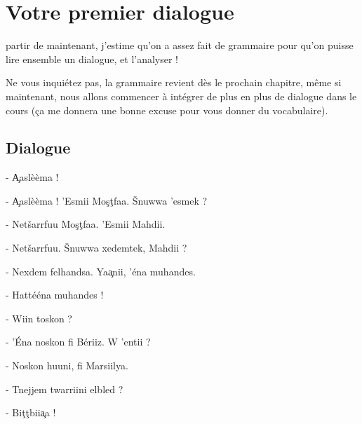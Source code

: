 \chapter{Votre premier dialogue}
 partir de maintenant, j'estime qu'on a assez fait de grammaire pour qu'on puisse lire ensemble un dialogue, et l'analyser !

Ne vous inquiétez pas, la grammaire revient dès le prochain chapitre, même si maintenant, nous allons commencer à intégrer de plus en plus de dialogue dans le cours (ça me donnera une bonne excuse pour vous donner du vocabulaire).

\section{Dialogue}
- \c{A}aslèèma !

- \c{A}aslèèma ! 'Esmii Mo\c{s}\c{t}faa. \v{S}nuwwa 'esmek ? 

- Net\v{s}arrfuu Mo\c{s}\c{t}faa. 'Esmii Mahdii. 

- Net\v{s}arrfuu. \v{S}nuwwa xedemtek, Mahdii ?

- Nexdem felhandsa. Ya\c{a}nii, 'éna muhandes.

- Hattééna muhandes !

- Wiin toskon ? 

- 'Éna noskon fi Bériiz. W 'entii ? 

- Noskon huuni, fi Marsiilya.

- Tnejjem twarriini elbled ? 

- Bi\c{t}\c{t}bii\c{a}a !
